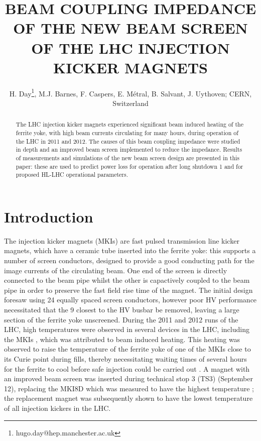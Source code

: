 \documentclass[a4paper,
              ]{jacow}
\begin{document}
\title{BEAM COUPLING IMPEDANCE OF THE NEW BEAM SCREEN OF THE LHC INJECTION KICKER MAGNETS}
\author{H. Day\thanks{hugo.day@hep.manchester.ac.uk}, M.J. Barnes, F. Caspers, E. Métral, B. Salvant, J. Uythoven;  CERN, Switzerland}

\maketitle 


\begin{abstract}
The LHC injection kicker magnets experienced significant beam induced heating of the ferrite yoke, with high beam currents circulating for many hours, during operation of the LHC in 2011 and 2012. The causes of this beam coupling impedance were studied in depth and an improved beam screen implemented to reduce the impedance. Results of measurements and simulations of the new beam screen design are presented in this paper: these are used to predict power loss for operation after long shutdown 1 and for proposed HL-LHC operational parameters.
\end{abstract}

\section{Introduction}

The injection kicker magnets (MKIs) are fast pulsed transmission line kicker magnets, which have a ceramic tube inserted into the ferrite yoke: this supports a number of screen conductors, designed to provide a good conducting path for the image currents of the circulating beam. One end of the screen is directly connected to the beam pipe whilst the other is capactively coupled to the beam pipe in order to preserve the fast field rise time of the magnet. The initial design foresaw using 24 equally spaced screen conductors, however poor HV performance necessitated that the 9 closest to the HV busbar be removed, leaving a large section of the ferrite yoke unscreened. During the 2011 and 2012 runs of the LHC, high temperatures were observed in several devices in the LHC, including the MKIs \cite{mki-heating}, which was attributed to beam induced heating. This heating was observed to raise the temperature of the ferrite yoke of one of the MKIs close to its Curie point during fills, thereby necessitating waiting times of several hours for the ferrite to cool before safe injection could be carried out \cite{mki-heating}. A magnet with an improved beam screen was inserted during technical stop 3 (TS3) (September 12), replacing the MKI8D which was measured to have the highest temperature \cite{mki-heatingTemp}; the replacement magnet was subsequently shown to have the lowest temperature of all injection kickers in the LHC.
\end{document}
